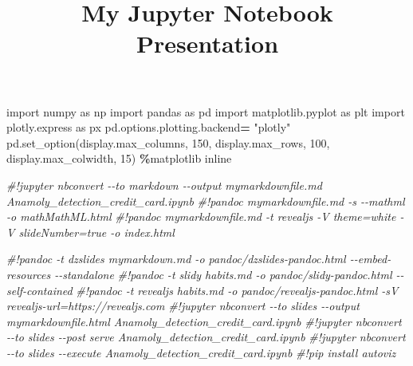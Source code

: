 \documentclass[
]{article}
\title{My Jupyter Notebook Presentation}
\author{}
\date{\vspace{-2.5em}}
\newenvironment{Shaded}{\begin{snugshade}}{\end{snugshade}}
\newcommand{\CommentTok}[1]{\textcolor[rgb]{0.56,0.35,0.01}{\textit{#1}}}
\newcommand{\DecValTok}[1]{\textcolor[rgb]{0.00,0.00,0.81}{#1}}
\newcommand{\ImportTok}[1]{#1}
\newcommand{\NormalTok}[1]{#1}
\newcommand{\OperatorTok}[1]{\textcolor[rgb]{0.81,0.36,0.00}{\textbf{#1}}}
\newcommand{\StringTok}[1]{\textcolor[rgb]{0.31,0.60,0.02}{#1}}
\begin{document}
\maketitle

\begin{Shaded}
\begin{Highlighting}[]
\ImportTok{import}\NormalTok{ numpy }\ImportTok{as}\NormalTok{ np}
\ImportTok{import}\NormalTok{ pandas }\ImportTok{as}\NormalTok{ pd}
\ImportTok{import}\NormalTok{ matplotlib.pyplot }\ImportTok{as}\NormalTok{ plt}
\ImportTok{import}\NormalTok{ plotly.express }\ImportTok{as}\NormalTok{ px}
\NormalTok{pd.options.plotting.backend}\OperatorTok{=} \StringTok{"plotly"}
\NormalTok{pd.set\_option(}\StringTok{\textquotesingle{}display.max\_columns\textquotesingle{}}\NormalTok{, }\DecValTok{150}\NormalTok{, }\StringTok{\textquotesingle{}display.max\_rows\textquotesingle{}}\NormalTok{, }\DecValTok{100}\NormalTok{, }\StringTok{\textquotesingle{}display.max\_colwidth\textquotesingle{}}\NormalTok{, }\DecValTok{15}\NormalTok{)}
\OperatorTok{\%}\NormalTok{matplotlib inline }
\end{Highlighting}
\end{Shaded}

\begin{Shaded}
\begin{Highlighting}[]
\CommentTok{\#!jupyter nbconvert {-}{-}to markdown {-}{-}output mymarkdownfile.md Anamoly\_detection\_credit\_card.ipynb}
\CommentTok{\#!pandoc mymarkdownfile.md {-}s {-}{-}mathml  {-}o mathMathML.html}
\CommentTok{\#!pandoc  mymarkdownfile.md  {-}t revealjs {-}V theme=white {-}V slideNumber=true {-}o index.html}
\end{Highlighting}
\end{Shaded}

\begin{Shaded}
\begin{Highlighting}[]

\CommentTok{\#!pandoc {-}t dzslides mymarkdown.md {-}o pandoc/dzslides{-}pandoc.html {-}{-}embed{-}resources {-}{-}standalone}
\CommentTok{\#!pandoc {-}t slidy habits.md {-}o pandoc/slidy{-}pandoc.html {-}{-}self{-}contained}
\CommentTok{\#!pandoc {-}t revealjs habits.md {-}o pandoc/revealjs{-}pandoc.html {-}sV revealjs{-}url=https://revealjs.com}
\CommentTok{\#!jupyter nbconvert {-}{-}to slides {-}{-}output mymarkdownfile.html Anamoly\_detection\_credit\_card.ipynb}
\CommentTok{\#!jupyter nbconvert {-}{-}to slides {-}{-}post serve Anamoly\_detection\_credit\_card.ipynb}
\CommentTok{\#!jupyter nbconvert {-}{-}to slides {-}{-}execute Anamoly\_detection\_credit\_card.ipynb}
\CommentTok{\#!pip install autoviz}
\end{Highlighting}
\end{Shaded}
\end{document}
